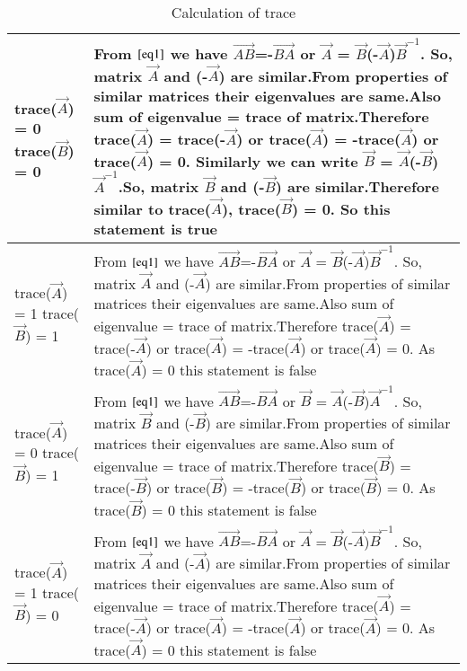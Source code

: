 \documentclass[journal,12pt,twocolumn]{IEEEtran}
\begin{document}
\begin{table}[h!]
\begin{center}
\begin{tabular}{|m{2.2cm}|m{6.3cm}|}\hline
        trace($\vec{A}$) = 0 trace($\vec{B}$) = 0 & From $\eqref{eq1}$ we have $\vec{AB}$=-$\vec{BA}$ or $\vec{A}$ = $\vec{B}$(-$\vec{A}$)$\vec{B}^{-1}$. So, matrix $\vec{A}$ and (-$\vec{A}$) are similar.From properties of similar matrices their eigenvalues are same.Also sum of eigenvalue = trace of matrix.Therefore trace($\vec{A}$) = trace(-$\vec{A}$) or trace($\vec{A}$) = -trace($\vec{A}$) or trace($\vec{A}$) = 0. Similarly we can write $\vec{B}$ = $\vec{A}$(-$\vec{B}$)$\vec{A}^{-1}$.So, matrix $\vec{B}$ and (-$\vec{B}$) are similar.Therefore similar to trace($\vec{A}$), trace($\vec{B}$) = 0. So this statement is true \\
        \hline
        trace($\vec{A}$) = 1 trace($\vec{B}$) = 1 & From $\eqref{eq1}$ we have $\vec{AB}$=-$\vec{BA}$ or $\vec{A}$ = $\vec{B}$(-$\vec{A}$)$\vec{B}^{-1}$. So, matrix $\vec{A}$ and (-$\vec{A}$) are similar.From properties of similar matrices their eigenvalues are same.Also sum of eigenvalue = trace of matrix.Therefore trace($\vec{A}$) = trace(-$\vec{A}$) or trace($\vec{A}$) = -trace($\vec{A}$) or trace($\vec{A}$) = 0. As trace($\vec{A}$) = 0 this statement is false\\
        \hline
        trace($\vec{A}$) = 0 trace($\vec{B}$) = 1 & From $\eqref{eq1}$ we have $\vec{AB}$=-$\vec{BA}$ or $\vec{B}$ = $\vec{A}$(-$\vec{B}$)$\vec{A}^{-1}$. So, matrix $\vec{B}$ and (-$\vec{B}$) are similar.From properties of similar matrices their eigenvalues are same.Also sum of eigenvalue = trace of matrix.Therefore trace($\vec{B}$) = trace(-$\vec{B}$) or trace($\vec{B}$) = -trace($\vec{B}$) or trace($\vec{B}$) = 0. As trace($\vec{B}$) = 0 this statement is false\\
        \hline
        trace($\vec{A}$) = 1 trace($\vec{B}$) = 0 & From $\eqref{eq1}$ we have $\vec{AB}$=-$\vec{BA}$ or $\vec{A}$ = $\vec{B}$(-$\vec{A}$)$\vec{B}^{-1}$. So, matrix $\vec{A}$ and (-$\vec{A}$) are similar.From properties of similar matrices their eigenvalues are same.Also sum of eigenvalue = trace of matrix.Therefore trace($\vec{A}$) = trace(-$\vec{A}$) or trace($\vec{A}$) = -trace($\vec{A}$) or trace($\vec{A}$) = 0. As trace($\vec{A}$) = 0 this statement is false\\
        \hline
        
    \end{tabular}
    \end{center}
    \caption{Calculation of trace}
    \label{tab:my_label}
\end{table}
\end{document}
